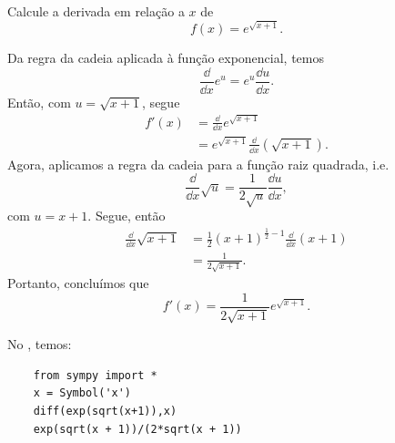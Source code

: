 \begin{exeresol}
  Calcule a derivada em relação a $x$ de
  \begin{equation}
    f(x) = e^{\sqrt{x+1}}.
  \end{equation}
\end{exeresol}
\begin{resol}
  Da regra da cadeia aplicada à função exponencial, temos
  \begin{equation}
    \frac{\dd}{\dd x}e^u = e^u\frac{\dd u}{\dd x}.
  \end{equation}
  Então, com $u = \sqrt{x+1}$, segue
  \begin{align}
    f'(x) &= \frac{\dd}{\dd x}e^{\sqrt{x+1}} \\
          &= e^{\sqrt{x+1}}\frac{\dd}{\dd x}\left(\sqrt{x+1}\right).
  \end{align}
  Agora, aplicamos a regra da cadeia para a função raiz quadrada, i.e.
  \begin{equation}
    \frac{\dd}{\dd x}\sqrt{u} = \frac{1}{2\sqrt{u}}\frac{\dd u}{\dd x},
  \end{equation}
  com $u = x+1$. Segue, então
  \begin{align}
    \frac{\dd}{\dd x}\sqrt{x+1} &= \frac{1}{2}(x+1)^{\frac{1}{2}-1}\frac{\dd}{\dd x}(x+1) \\
                                &= \frac{1}{2\sqrt{x+1}}.
  \end{align}
  Portanto, concluímos que
  \begin{equation}
    f'(x) = \frac{1}{2\sqrt{x+1}}e^{\sqrt{x+1}}.
  \end{equation}

  \ifispython
  No \sympy, temos:
  \begin{lstlisting}
    from sympy import *
    x = Symbol('x')
    diff(exp(sqrt(x+1)),x)
    exp(sqrt(x + 1))/(2*sqrt(x + 1))
  \end{lstlisting}
  \fi  
\end{resol}

